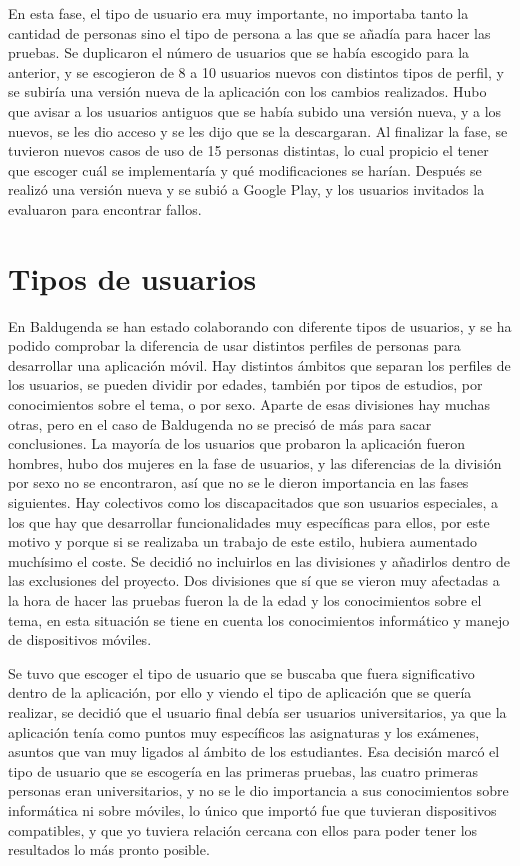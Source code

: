 En esta fase, el tipo de usuario era muy importante, no importaba tanto la cantidad de personas sino el tipo de persona a las que se añadía para hacer las pruebas.
Se duplicaron el número de usuarios que se había escogido para la anterior, y se escogieron de 8 a 10 usuarios nuevos con distintos tipos de perfil, y se subiría una versión nueva de la aplicación con los cambios realizados.
Hubo que avisar a los usuarios antiguos que se había subido una versión nueva, y a los nuevos, se les dio acceso y se les dijo que se la descargaran.
Al finalizar la fase, se tuvieron nuevos casos de uso de 15 personas distintas, lo cual propicio el tener que escoger cuál se implementaría y qué modificaciones se harían.
Después se realizó una versión nueva y se subió a Google Play, y los usuarios invitados la evaluaron para encontrar fallos.



\section{Tipos de usuarios}
\label{secc:tipo de usuarios}

En Baldugenda se han estado colaborando con diferente tipos de usuarios, y se ha podido comprobar la diferencia de usar distintos perfiles de personas para desarrollar una aplicación móvil.
Hay distintos ámbitos que separan los perfiles de los usuarios, se pueden dividir por edades, también por tipos de estudios, por conocimientos sobre el tema, o por sexo.
Aparte de esas divisiones hay muchas otras, pero en el caso de Baldugenda no se precisó de más para sacar conclusiones.
La mayoría de los usuarios que probaron la aplicación fueron hombres, hubo dos mujeres en la fase de usuarios, y las diferencias de la división por sexo no se encontraron, así que no se le dieron importancia en las fases siguientes.
Hay colectivos como los discapacitados que son usuarios especiales, a los que hay que desarrollar funcionalidades muy específicas para ellos, por este motivo y porque si se realizaba un trabajo de este estilo, hubiera aumentado muchísimo el coste. Se decidió no incluirlos en las divisiones y añadirlos dentro de las exclusiones del proyecto.
Dos divisiones que sí que se vieron muy afectadas a la hora de hacer las pruebas fueron la de la edad y los conocimientos sobre el tema, en esta situación se tiene en cuenta los conocimientos informático y manejo de dispositivos móviles.

Se tuvo que escoger el tipo de usuario que se buscaba que fuera significativo dentro de la aplicación, por ello y viendo el tipo de aplicación que se quería realizar, se decidió que el usuario final debía ser usuarios universitarios, ya que la aplicación tenía como puntos muy específicos las asignaturas y los exámenes, asuntos que van muy ligados al ámbito de los estudiantes.
Esa decisión marcó el tipo de usuario que se escogería en las primeras pruebas, las cuatro primeras personas  eran universitarios, y no se le dio importancia a sus conocimientos sobre informática ni sobre móviles, lo único que importó fue que tuvieran dispositivos compatibles, y que yo tuviera relación cercana con ellos para poder tener los resultados lo más pronto posible.

